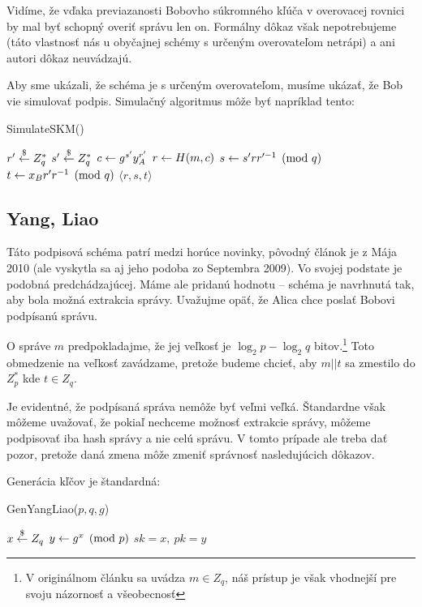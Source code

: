 \begin{poznamka}
    Vidíme, že vďaka previazanosti Bobovho súkromného kľúča v overovacej
    rovnici by mal byť schopný overiť správu len on.
    Formálny dôkaz však nepotrebujeme (táto vlastnosť nás u obyčajnej
    schémy s určeným overovateľom netrápi) a ani autori dôkaz
    neuvádzajú.
\end{poznamka}

Aby sme ukázali, že schéma je s určeným overovateľom, musíme ukázať,
že Bob vie simulovať podpis. Simulačný algoritmus môže byť napríklad
tento:
\begin{procedure}
    \caption{SimulateSKM()}
    $r' \overset{\$}{\leftarrow} Z_q^*$\;
    $s' \overset{\$}{\leftarrow} Z_q^*$\;
    $c \leftarrow g^{s'} y_A^{r'}$\;
    $r \leftarrow H(m,c)$\;
    $s \leftarrow s' r r'^{-1} \pmod{q}$\;
    $t \leftarrow x_B r' r^{-1} \pmod{q}$\;
    \Return $\langle r,s,t \rangle$\;
\end{procedure}


\subsection{Yang, Liao}
Táto podpisová schéma patrí medzi horúce novinky, pôvodný článok
\cite{designated_verifier2}
je z Mája 2010 (ale vyskytla sa aj jeho podoba zo Septembra 2009).
Vo svojej podstate je podobná predchádzajúcej.
Máme ale pridanú hodnotu -- schéma je navrhnutá tak, 
aby bola možná extrakcia správy.
Uvažujme opäť, že Alica chce poslať Bobovi podpísanú správu.

O správe $m$ predpokladajme, že jej veľkosť je $\log_2 p - \log_2 q$
bitov.\footnote{V originálnom článku sa uvádza $m\in Z_q$,
    náš prístup je však vhodnejší pre svoju názornosť a všeobecnosť}
Toto obmedzenie na veľkosť zavádzame, pretože budeme chcieť, aby
$m||t$ sa zmestilo do $Z_p^*$ kde $t \in Z_q$.

\begin{poznamka}
    Je evidentné, že podpísaná správa nemôže byť veľmi veľká.
    Štandardne však môžeme uvažovať, že
    pokiaľ nechceme možnosť extrakcie správy, 
    môžeme podpisovať iba hash správy a nie celú správu.
    V tomto prípade ale treba dať pozor, pretože daná zmena môže
    zmeniť správnosť nasledujúcich dôkazov.
\end{poznamka}

Generácia kľčov je štandardná:
\begin{procedure}
    \caption{GenYangLiao($p,q,g$)}
    $x \overset{\$}{\leftarrow} Z_q$\;
    $y \leftarrow g^x \pmod{p}$\;
    \Return $sk=x,\ pk=y$\;
\end{procedure}


